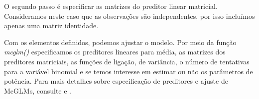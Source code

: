 \begin{knitrout}
\color{fgcolor}\begin{kframe}
\begin{alltt}
 \hlkwb{<-}  \hlopt{~}  \hlopt{+}  \hlopt{*} 
 \hlkwb{<-}  \hlopt{~}  \hlopt{+}  \hlopt{*} 

\hlopt{$} \hlkwb{<-} \hlopt{$} \hlopt{/} \hlopt{$}
 \hlkwb{<-}  \hlopt{~}  \hlopt{+}  \hlopt{*} 
\end{alltt}
\end{kframe}
\end{knitrout}

O segundo passo é especificar as matrizes do preditor linear matricial. Consideramos neste caso que as observações são independentes, por isso incluímos apenas uma matriz identidade.

\begin{knitrout}
\color{fgcolor}\begin{kframe}
\begin{alltt}
 \hlkwb{<-} 
\end{alltt}
\end{kframe}
\end{knitrout}

Com os elementos definidos, podemos ajustar o modelo. Por meio da função \emph{mcglm()} especificamos os preditores lineares para média, as matrizes dos preditores matriciais, as funções de ligação, de variância, o número de tentativas para a variável binomial e se temos interesse em estimar ou não os parâmetros de potência. Para mais detalhes sobre especificação de preditores e ajuste de McGLMs, consulte \citet{Bonat16} e \citet{mcglm}.

